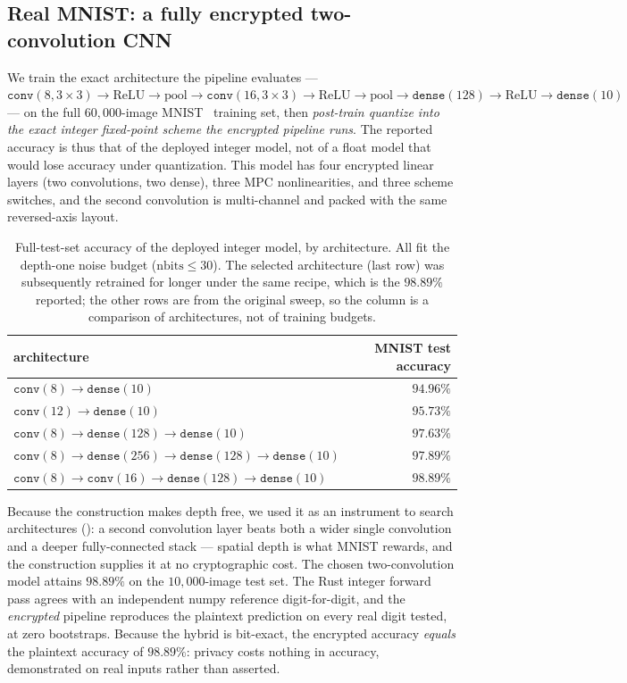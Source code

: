 \documentclass[11pt]{article}
\theoremstyle{plain}
\theoremstyle{definition}
\theoremstyle{remark}
\newcommand{\ReLU}{\mathrm{ReLU}}
\begin{document}
\subsection{Real MNIST: a fully encrypted two-convolution CNN}\label{sec:mnist}

We train the exact architecture the pipeline evaluates --- $\texttt{conv}(8,
3\times3)\to\ReLU\to\text{pool}\to\texttt{conv}(16,3\times3)\to\ReLU\to
\text{pool}\to\texttt{dense}(128)\to\ReLU\to\texttt{dense}(10)$ --- on the
full $60{,}000$-image MNIST~\cite{MNIST} training set, then \emph{post-train
quantize into the exact integer fixed-point scheme the encrypted pipeline
runs}. The reported accuracy is thus that of the deployed integer model, not
of a float model that would lose accuracy under quantization. This model has
four encrypted linear layers (two convolutions, two dense), three MPC
nonlinearities, and three scheme switches, and the second convolution is
multi-channel and packed with the same reversed-axis layout.

\begin{table}[t]
\centering
\caption{Full-test-set accuracy of the deployed integer model, by
architecture. All fit the depth-one noise budget ($\text{nbits}\le 30$). The
selected architecture (last row) was subsequently retrained for longer under
the same recipe, which is the $98.89\%$ reported; the other rows are from the
original sweep, so the column is a comparison of architectures, not of
training budgets.}
\label{tab:arch}
\begin{tabular}{@{}lr@{}}
\toprule
architecture & MNIST test accuracy \\
\midrule
$\texttt{conv}(8) \to \texttt{dense}(10)$ & $94.96\%$ \\
$\texttt{conv}(12) \to \texttt{dense}(10)$ & $95.73\%$ \\
$\texttt{conv}(8) \to \texttt{dense}(128) \to \texttt{dense}(10)$ & $97.63\%$ \\
$\texttt{conv}(8) \to \texttt{dense}(256)\to\texttt{dense}(128)\to\texttt{dense}(10)$ & $97.89\%$ \\
$\texttt{conv}(8)\to\texttt{conv}(16)\to\texttt{dense}(128)\to\texttt{dense}(10)$ & $\mathbf{98.89\%}$ \\
\bottomrule
\end{tabular}
\end{table}

Because the construction makes depth free, we used it as an instrument to
search architectures (): a second convolution layer beats both
a wider single convolution and a deeper fully-connected stack --- spatial
depth is what MNIST rewards, and the construction supplies it at no
cryptographic cost. The chosen two-convolution model attains $98.89\%$ on the
$10{,}000$-image test set. The Rust integer forward pass agrees with an
independent numpy reference digit-for-digit, and the \emph{encrypted}
pipeline reproduces the plaintext prediction on every real digit tested, at
zero bootstraps. Because the hybrid is bit-exact, the encrypted accuracy
\emph{equals} the plaintext accuracy of $98.89\%$: privacy costs nothing in
accuracy, demonstrated on real inputs rather than asserted.
\end{document}

